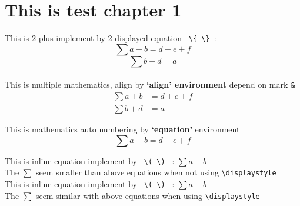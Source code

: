 \documentclass[12pt, a4paper, twoside]{report}
\begin{document}
\chapter{This is test chapter 1}

This is 2 plus implement by 2 displayed equation \verb` \{ \} `:
\[
\sum a+b = d + e + f
\]
\[
\sum b+d = a
\] \\

This is multiple mathematics, align by \textbf{`align' environment} depend on mark \verb|&|
\begin{align}
    \sum a+b &= d + e + f \label{eq: no1}  \\
    \sum b+d &= a \label{eq: no2}
\end{align}

This is mathematics auto numbering by \textbf{`equation'} environment
\begin{equation}
    \sum a+b = d + e + f \label{eq: no3}
\end{equation}

This is inline equation implement by \verb^ \( \) ^ : $ \sum a+b $ \\
\hspace{1cm}The $\sum$ seem smaller than above equations when not using \verb!\displaystyle! \\

This is inline equation implement by \verb^ \( \) ^ : $ \displaystyle  \sum a+b $ \\
\hspace{1cm}The $\sum$ seem similar with above equations when using \verb!\displaystyle! \\
\end{document}

